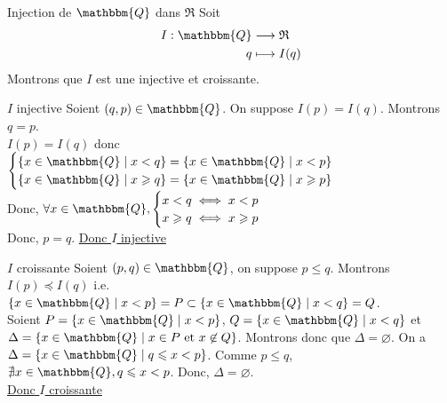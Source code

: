 \documentclass[a4paper]{report}
\let\emptyset\varnothing
\let\ge\geqslant
\let\le\leqslant
\newcommand{\Q}{\mathbbm{Q}}
\renewcommand{\O}{\emptyset}
\newcommand{\rel}{\preceq}
\begin{document}
	\begin{section}{Injection de $\Q$ dans $\mathfrak{R}$}
		Soit \begin{align*}
			I: \Q &\longrightarrow \mathfrak{R} \\
			q &\longmapsto I(q) 
		\end{align*} Montrons que $I$ est une injective et croissante.

		\begin{subsection}{$I$ injective}
			Soient $(q,p) \in \Q$. On suppose $I(p) = I(q)$. Montrons $q = p$.\\
			$I(p) = I(q)$ donc  $
			\begin{cases}
				\{x \in \Q  \mid x < q \} = \{x \in \Q  \mid x < p\}\\  
				\{x \in \Q  \mid x \ge q \} = \{x \in \Q  \mid x \ge p\}\\
			\end{cases}$\\
			Donc, $\forall x \in \Q, \begin{cases}
				x < q \iff x < p\\
				x \ge q \iff x \ge p
			\end{cases}$\\
			Donc, $p = q$.
			\underline{Donc $I$ injective}
		\end{subsection}

		\begin{subsection}{$I$ croissante}
			Soient $(p,q) \in \Q$, on suppose $p \le q$. Montrons $I(p) \rel I(q)$ i.e. \\$\{x \in \Q  \mid x < p\} = P \subset \{x\in \Q  \mid x < q\} = Q$.\\
			Soient $P = \{x \in \Q  \mid x < p\}$, $Q = \{x\in \Q  \mid x < q\}$ et $\Delta = \{x \in \Q  \mid x \in P~\text{et}~x \not\in Q\}$. Montrons donc que $\Delta = \O$.
			On a $\Delta = \{x \in  \Q  \mid q \le x < p\}$. Comme $p \le q$, $\nexists x \in \Q, q \le x < p$.
			Donc, $\Delta = \O$.\\
			\underline{Donc $I$ croissante}
		\end{subsection}

	\end{section}
\end{document}

